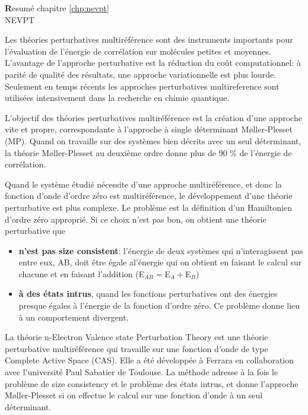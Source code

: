 \pagestyle{empty}
\begin{center}
{\Huge \textbf Resum\'e chapitre \ref{chp:nevpt} \\ NEVPT }
\end{center}

Les th\'eories perturbatives multir\'ef\'erence sont des instruments importants
pour l'\'evaluation de l'\'energie de corr\'elation sur mol\'ecules petites et
moyennes. L'avantage de l'approche perturbative est la r\'eduction du co\^ut
computationnel: \`a parit\'e de qualit\'e des r\'esultats, une approche
variationnelle est plus lourde. Seulement en temps r\'ecents les approches
perturbatives multireference sont utilis\'ees intensivement dans la recherche
en chimie quantique.

L'objectif des th\'eories perturbatives multir\'ef\'erence est la cr\'eation
d'une approche vite et propre, correspondante \`a l'approche \`a single
d\'eterminant M{\o}ller-Plesset (MP). Quand on travaille sur des syst\`emes
bien d\'ecrits avec un seul d\'eterminant, la th\'eorie M{\o}ller-Plesset au
deuxi\`eme ordre donne plus de 90 \% de l'\'energie de corr\'elation.

Quand le syst\`eme \'etudi\'e n\'ecessite d'une approche multir\'ef\'erence, et donc la
fonction d'onde d'ordre z\'ero est multir\'ef\'erence, le d\'eveloppement d'une
th\'eorie perturbative est plus complexe. Le probl\`eme est la d\'efinition
d'un Hamiltonien d'ordre z\'ero appropri\'e. Si ce choix n'est pas bon, on
obtient une th\'eorie perturbative que
\begin{itemize}
\item \textbf{n'est pas size consistent}: l'\'energie de deux syst\`emes
qui n'interagissent pas entre eux, AB, doit \^etre \'egale al'\'energie
qui on obtient en faisant le calcul sur chacune et en faisant l'addition
(E$_{AB} = $E$_A + $E$_B$)
\item \textbf{\`a des \'etats intrus}, quand les fonctions perturbatives
ont des \'energies presque \'egales \`a l'\'energie de la fonction d'ordre z\'ero.
Ce probl\`eme donne lieu \`a un comportement divergent.
\end{itemize}

La th\'eorie n-Electron Valence state Perturbation Theory est une
th\'eorie perturbative multir\'ef\'erence qui travaille sur une fonction d'onde de
type Complete Active Space (CAS). Elle a \'et\'e d\'evelopp\'ee \`a Ferrara en collaboration avec l'universit\'e
Paul Sabatier de Toulouse.  La m\'ethode adresse \`a la fois le probl\`eme
de size consistency et le probl\`eme des \'etats intrus, et donne l'approche
M{\o}ller-Plesset si on effectue le calcul sur une fonction d'onde \`a un
seul d\'eterminant.

